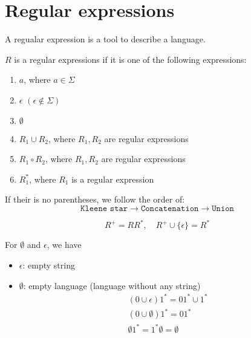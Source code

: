 
\section{Regular expressions}

A regualar expression is a tool to describe a language.

\begin{definition}
    $R$ is a regular expressions if it is one of the following expressions: 
    \begin{enumerate}[label=(\arabic*)]
        \item $a$, where $a \in \Sigma$
        \item $\epsilon$ $(\epsilon \notin \Sigma)$
        \item $\emptyset$
        \item $R_1 \cup R_2$,  where $R_1, R_2$ are regular expressions
        \item $R_1 \circ R_2$, where $R_1, R_2$ are regular expressions
        \item $R_1^*$,  where $R_1$ is a regular expression
    \end{enumerate}
\end{definition}

If their is no parentheses, we follow the order of:
\[
\boxed{\texttt{Kleene star}} \rightarrow \boxed{\texttt{Concatenation}} \rightarrow \boxed{\texttt{Union}}
\]

\newpage

\begin{remark}
    \[
        R^+ = RR^*, \quad R^+ \cup \{\epsilon\} = R^*
    \]
\end{remark}

For $\emptyset$ and $\epsilon$, we have 
\begin{itemize}
    \item $\epsilon$: empty string
    \item $\emptyset$: empty language (language without any string)
    \begin{align*}
        &(0 \cup \epsilon)1^*=01^* \cup 1^* \\
        &(0 \cup \emptyset)1^*=01^* \\
        &\emptyset 1^* = 1^* \emptyset = \emptyset
    \end{align*}
    
\end{itemize}


